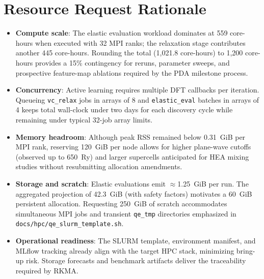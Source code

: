 \documentclass[11pt]{article}
\begin{document}
\section*{Resource Request Rationale}
\begin{itemize}[leftmargin=1.5em]
  \item \textbf{Compute scale}: The elastic evaluation workload dominates at 559 core-hours when executed with 32 MPI ranks; the relaxation stage contributes another 445 core-hours. Rounding the total (1{,}021.8 core-hours) to 1{,}200 core-hours provides a 15\% contingency for reruns, parameter sweeps, and prospective feature-map ablations required by the PDA milestone process.
  \item \textbf{Concurrency}: Active learning requires multiple DFT callbacks per iteration. Queueing \texttt{vc\_relax} jobs in arrays of 8 and \texttt{elastic\_eval} batches in arrays of 4 keeps total wall-clock under two days for each discovery cycle while remaining under typical 32-job array limits.
  \item \textbf{Memory headroom}: Although peak RSS remained below 0.31~GiB per MPI rank, reserving 120~GiB per node allows for higher plane-wave cutoffs (observed up to 650~Ry) and larger supercells anticipated for HEA mixing studies without resubmitting allocation amendments.
  \item \textbf{Storage and scratch}: Elastic evaluations emit \(\approx\)1.25~GiB per run. The aggregated projection of 42.3~GiB (with safety factors) motivates a 60~GiB persistent allocation. Requesting 250~GiB of scratch accommodates simultaneous MPI jobs and transient \texttt{qe\_tmp} directories emphasized in \texttt{docs/hpc/qe\_slurm\_template.sh}.
  \item \textbf{Operational readiness}: The SLURM template, environment manifest, and MLflow tracking already align with the target HPC stack, minimizing bring-up risk. Storage forecasts and benchmark artifacts deliver the traceability required by RKMA.
\end{itemize}
\end{document}
